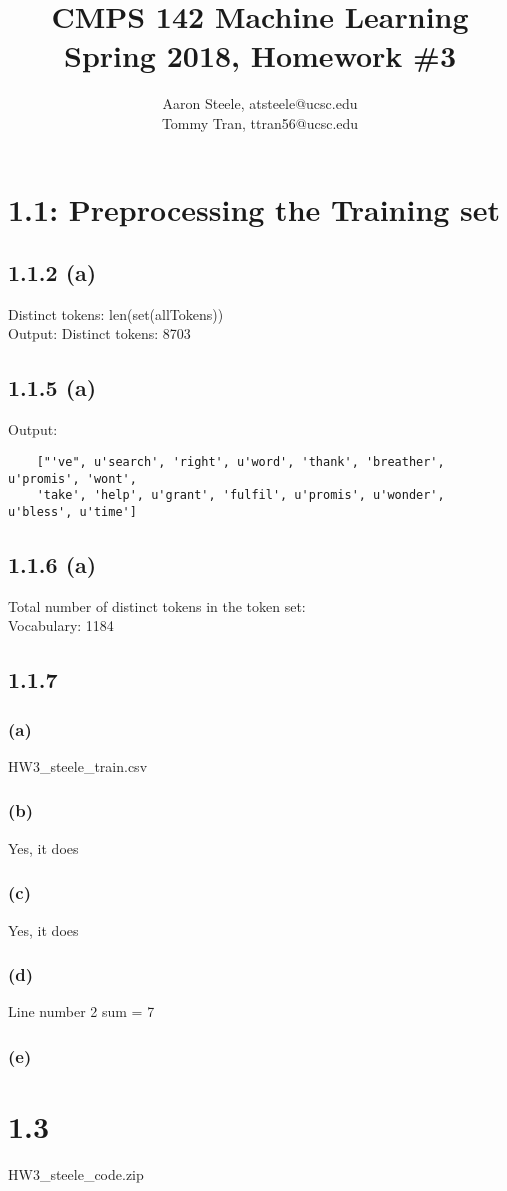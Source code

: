 \documentclass[12pt]{article}
\title{\textbf{CMPS 142 Machine Learning\\ Spring 2018, Homework \#3}}
\date{}
\author{Aaron Steele, atsteele@ucsc.edu\\
	Tommy Tran, ttran56@ucsc.edu}
\begin{document}
	
	\maketitle
	
	\section*{1.1: Preprocessing the Training set}
	\subsection*{1.1.2 (a)}
		Distinct tokens:  len(set(allTokens))\\
			Output: Distinct tokens:  8703
	
	\subsection*{1.1.5 (a)}
	Output: 
	\begin{verbatim}	
	["'ve", u'search', 'right', u'word', 'thank', 'breather', u'promis', 'wont', 
	'take', 'help', u'grant', 'fulfil', u'promis', u'wonder', u'bless', u'time']
	\end{verbatim}
	
	\subsection*{1.1.6 (a)}
	Total number of distinct tokens in the token set:\\
	Vocabulary: 1184
	
	
	\subsection*{1.1.7}
	\subsubsection*{(a)}
	HW3\_steele\_train.csv
	
	\subsubsection*{(b)}
	Yes, it does
	
	\subsubsection*{(c)}
	Yes, it does
	
	\subsubsection*{(d)}
	Line number 2 sum = 7
	
	\subsubsection*{(e)}
	

	\section*{1.3}
		HW3\_steele\_code.zip
\end{document}
